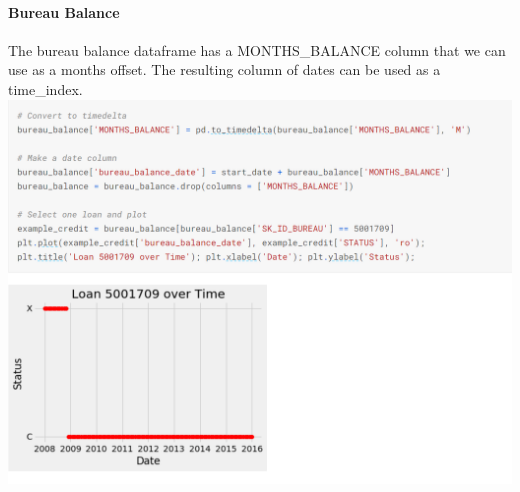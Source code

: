 \documentclass[twoside,a4paper]{article}
\begin{document}
\paragraph{Bureau Balance}
The bureau balance dataframe has a MONTHS\_BALANCE column that we can use as a months offset. The resulting column of dates can be used as a time\_index.\\
\includegraphics[scale=.8]{load10.png}
\end{document}
